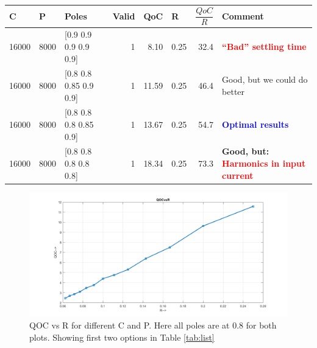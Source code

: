 \begin{enumerate}
		\begin{table}[htbp]
			\caption{}
			\begin{tabular}{rrlrrrrl}
				\toprule
				\multicolumn{1}{l}{C} & \multicolumn{1}{l}{P} & Poles & \multicolumn{1}{l}{Valid} & \multicolumn{1}{l}{QoC} & \multicolumn{1}{l}{R} & \multicolumn{1}{l}{$\dfrac{QoC}{R}$  } & Comment \\ 
				\midrule
				16000 & 8000 & [0.9 0.9 0.9 0.9 0.9] & 1 & 8.10 & 0.25 & 32.4 & \textcolor{red}{\textbf{“Bad” settling time}} \\ 
				16000 & 8000 & [0.8 0.8 0.85 0.9 0.9] & 1 & 11.59 & 0.25 & 46.4 & Good, but we could do better \\ 
				16000 & 8000 & [0.8 0.8 0.8 0.85 0.9] & 1 & 13.67 & 0.25 & 54.7 & \textcolor{blue}{\textbf{Optimal results}} \\ 
				16000 & 8000 & [0.8 0.8 0.8 0.8 0.8] & 1 & 18.34 & 0.25 & 73.3 & \textbf{Good, but: \textcolor{red}{Harmonics in input current}} \\ 
				\midrule
			\end{tabular}
			\label{tab:poles}
		\end{table}
\end{enumerate}

\begin{figure}[h]
	\begin{center}
		\includegraphics[width=\linewidth]{img/qocfinal}
		\caption{QOC vs R for different C and P. Here all poles are at 0.8 for both plots. Showing first two options in Table \ref{tab:list}}
		\label{fig:qoc2}
	\end{center}
\end{figure}